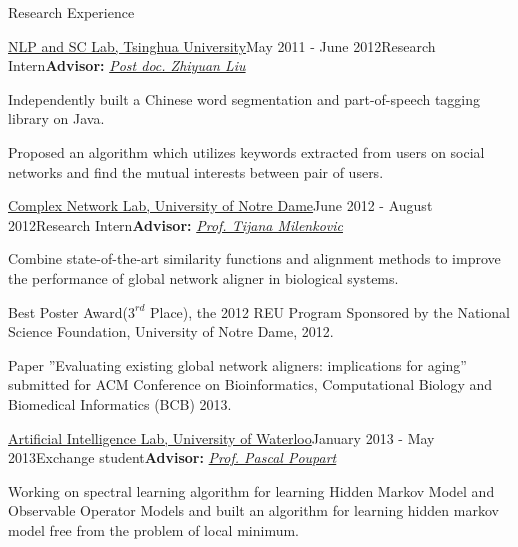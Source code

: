 \documentclass{resume} %
\begin{document}
\begin{rSection}{Research Experience}
\begin{rSubsection}{\href{http://nlp.csai.tsinghua.edu.cn}{NLP and SC Lab, Tsinghua University}}{May 2011 - June 2012}{Research Intern}{\textbf{Advisor: }\href{http://nlp.csai.tsinghua.edu.cn/~lzy/}{\textit{Post doc. Zhiyuan Liu}}}
\item Independently built a Chinese word segmentation and part-of-speech tagging
library on Java.
\item Proposed an algorithm which utilizes keywords extracted from users on social
networks and find the mutual interests between pair of users.
\end{rSubsection}


\begin{rSubsection}{\href{http://www3.nd.edu/~cone/}{Complex Network Lab, University of Notre Dame}}{June 2012 - August 2012}{Research Intern}{\textbf{Advisor: }\href{http://www.cse.nd.edu/~tmilenko/}{\textit{Prof. Tijana Milenkovic}}}
\item Combine state-of-the-art similarity functions and alignment methods to improve
the performance of global network aligner in biological systems.
\item Best Poster Award($3^{rd}$ Place), the 2012 REU Program Sponsored by the National
Science Foundation, University of Notre Dame, 2012.
\item Paper ”Evaluating existing global network aligners: implications for aging”
submitted for ACM Conference on Bioinformatics, Computational Biology and
Biomedical Informatics (BCB) 2013.
\end{rSubsection}

\begin{rSubsection}{\href{http://ai.uwaterloo.ca/index.html}{Artificial Intelligence Lab, University of Waterloo}}{January 2013 - May 2013}{Exchange student}{\textbf{Advisor: }{\href{https://cs.uwaterloo.ca/~ppoupart/}{\textit{Prof. Pascal Poupart}}}}
\item{}Working on spectral learning algorithm for learning Hidden Markov Model and
Observable Operator Models and built an algorithm for learning hidden markov model free from the problem of local minimum.
\end{rSubsection}

\end{rSection}
\end{document}
